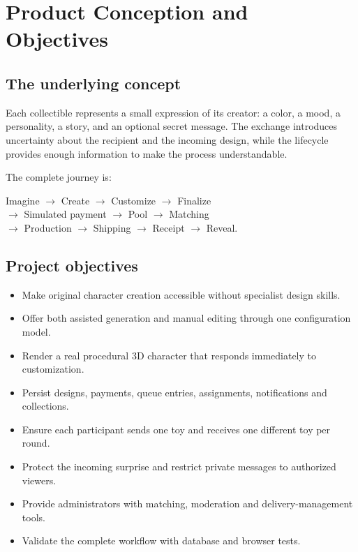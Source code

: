 \documentclass[11pt,a4paper]{article}
\begin{document}
\section{Product Conception and Objectives}

\subsection{The underlying concept}
Each collectible represents a small expression of its creator: a color, a mood, a personality, a story, and an optional secret message. The exchange introduces uncertainty about the recipient and the incoming design, while the lifecycle provides enough information to make the process understandable.

The complete journey is:
\begin{center}
\small
Imagine $\rightarrow$ Create $\rightarrow$ Customize $\rightarrow$ Finalize\\
$\rightarrow$ Simulated payment $\rightarrow$ Pool $\rightarrow$ Matching\\
$\rightarrow$ Production $\rightarrow$ Shipping $\rightarrow$ Receipt $\rightarrow$ Reveal.
\end{center}

\subsection{Project objectives}
\begin{itemize}
  \item Make original character creation accessible without specialist design skills.
  \item Offer both assisted generation and manual editing through one configuration model.
  \item Render a real procedural 3D character that responds immediately to customization.
  \item Persist designs, payments, queue entries, assignments, notifications and collections.
  \item Ensure each participant sends one toy and receives one different toy per round.
  \item Protect the incoming surprise and restrict private messages to authorized viewers.
  \item Provide administrators with matching, moderation and delivery-management tools.
  \item Validate the complete workflow with database and browser tests.
\end{itemize}
\end{document}
